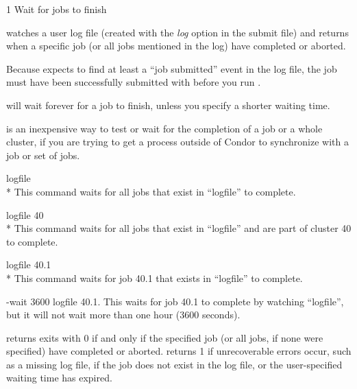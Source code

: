 \begin{ManPage}{\label{man-condor-wait}}{1}
{Wait for jobs to finish}

\Synopsis
{}
\ToolArgsBase

\ToolArgsBase
{}



\Description

 watches a user log file (created with the \emph{log}
option in the submit file) and returns when a specific job (or all
jobs mentioned in the log) have completed or aborted. 

Because  expects to find at least a ``job submitted''
event in the log file, the job must have been successfully submitted
with  before you run .

 will wait forever for a job to finish, unless you
specify a shorter waiting time.

\begin{Options}
    \ToolArgsBaseDesc

\end{Options}

\GenRem 

 is an inexpensive way to test or wait for the completion
of a job or a whole cluster, if you are trying to get a process
outside of Condor to synchronize with a job or set of jobs.

\Examples

 logfile\\*
This command waits for all jobs that exist in ``logfile'' to complete.

 logfile 40\\*
This command waits for all jobs that exist in ``logfile'' and are part
of cluster 40 to complete.

 logfile 40.1\\*
This command waits for job 40.1 that exists in ``logfile'' to
complete.

 -wait 3600 logfile 40.1. This waits for job 40.1 to
complete by watching ``logfile'', but it will not wait more than one
hour (3600 seconds).

\ExitStatus

 returns exits with 0 if and only if the specified job
(or all jobs, if none were specified) have completed or
aborted.  returns 1 if unrecoverable errors occur, such
as a missing log file, if the job does not exist in the log file, or
the user-specified waiting time has expired.

\end{ManPage}

